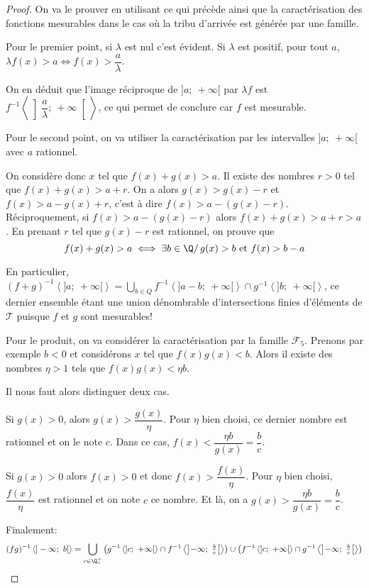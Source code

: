 \begin{proof}
On va le prouver en utilisant ce qui précède ainsi que la caractérisation des fonctions mesurables dans le cas où la tribu d'arrivée est générée par une famille.

Pour le premier point, si $\lambda$ est nul c'est évident. Si $\lambda$ est positif, pour tout $a$, $\lambda f(x)>a \iff f(x) > \dfrac{a}{\lambda}$. 

On en déduit que l'image réciproque de $]a;~+\infty[$ par $\lambda f$ est $f^{-1}\left< \left]\dfrac{a}{\lambda};~+\infty\right[ \right>$, ce qui permet de conclure car $f$ est mesurable.

Pour le second point, on va utiliser la caractérisation par les intervalles $]a;~+\infty[$ avec $a$ rationnel. 

On considère donc $x$ tel que $f(x)+g(x)>a$. Il existe des nombres $r>0$ tel que $f(x)+g(x)>a+r$. On a alors $g(x)>g(x)-r$ et $f(x)>a-g(x)+r$, c'est à dire $f(x)>a-\left(g(x)-r\right)$. Réciproquement, si $f(x)>a-\left(g(x)-r\right)$ alors $f(x)+g(x)>a+r>a$. En prenant $r$ tel que $g(x)-r$ est rationnel, on  prouve que
\[
f(x)+g(x)>a \iff \exists b \in \Q/ \, g(x)>b \text{ et }f(x)>b-a
\]

En particulier, $(f+g)^{-1}\left<]a;~+\infty[\right> = \bigcup \limits_{b \in Q} f^{-1}\left<]a-b;~+\infty[\right> \cap g^{-1}\left<]b;~+\infty[\right>$, ce dernier ensemble étant une union dénombrable d'intersections finies d'éléments de $\mathcal{T}$ puisque $f$ et $g$ sont mesurables!

Pour le produit, on va considérer la caractérisation par la famille $\mathcal{F}_5$. Prenons par exemple $b<0$ et considérons $x$ tel que $f(x)g(x)<b$. Alors il existe des nombres $\eta>1$ tels que $f(x)g(x)<\eta b$.

Il nous faut alors distinguer deux cas. 

Si $g(x)>0$, alors $g(x) > \dfrac{g(x)}{\eta}$. Pour $\eta$ bien choisi, ce dernier nombre est rationnel et on le note $c$. Dans ce cas, $f(x)<\dfrac{\eta b}{g(x)} = \dfrac{b}{c}$.

Si $g(x)>0$ alors $f(x)>0$ et donc $f(x) > \dfrac{f(x)}{\eta}$. Pour $\eta$ bien choisi, $\dfrac{f(x)}{\eta}$ est rationnel et on note $c$ ce nombre. Et là, on a $g(x)>\dfrac{\eta b}{g(x)} = \dfrac{b}{c}$.

Finalement:
\[(fg)^{-1}\left<]-\infty;~b[\right> = \bigcup \limits_{c \in \Q^{+}_{*}} \left(g^{-1}\left<]c;~+\infty[\right> \cap f^{-1}\left<\left]-\infty;~\tfrac{b}{c}\right[\right>\right) \cup \left(f^{-1}\left<]c;~+\infty[\right> \cap g^{-1}\left<\left]-\infty;~\tfrac{b}{c}\right[\right>\right)\]



\end{proof}
